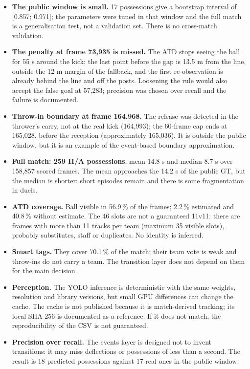 \documentclass[10pt,a4paper]{article}
\begin{document}
\begin{itemize}
\item \textbf{The public window is small.} 17 possessions give a bootstrap interval of
[0.857; 0.971]; the parameters were tuned in that window and the full match is a
generalisation test, not a validation set. There is no cross-match validation.
\item \textbf{The penalty at frame 73,935 is missed.} The ATD stops seeing the ball for 55 s
around the kick; the last point before the gap is 13.5 m from the line, outside the 12 m
margin of the fallback, and the first re-observation is already behind the line and off the
posts. Loosening the rule would also accept the false goal at 57,283; precision was chosen
over recall and the failure is documented.
\item \textbf{Throw-in boundary at frame 164,968.} The release was detected in the thrower's
carry, not at the real kick (164,993); the 60-frame cap ends at 165,028, before the
reception (approximately 165,036). It is outside the public window, but it is an example of
the event-based boundary approximation.
\item \textbf{Full match: 259 H/A possessions}, mean 14.8 s and median 8.7 s over 158,857
scored frames. The mean approaches the 14.2 s of the public GT, but the median is shorter:
short episodes remain and there is some fragmentation in duels.
\item \textbf{ATD coverage.} Ball visible in 56.9\,\% of the frames; 2.2\,\% estimated and
40.8\,\% without estimate. The 46 slots are not a guaranteed 11v11: there are frames with
more than 11 tracks per team (maximum 35 visible slots), probably substitutes, staff or
duplicates. No identity is inferred.
\item \textbf{Smart tags.} They cover 70.1\,\% of the match; their team vote is weak and
throw-ins do not carry a team. The transition layer does not depend on them for the main
decision.
\item \textbf{Perception.} The YOLO inference is deterministic with the same weights,
resolution and library versions, but small GPU differences can change the cache. The cache
is not published because it is match-derived tracking; its local SHA-256 is documented as a
reference. If it does not match, the reproducibility of the CSV is not guaranteed.
\item \textbf{Precision over recall.} The events layer is designed not to invent
transitions: it may miss deflections or possessions of less than a second. The result is 18
predicted possessions against 17 real ones in the public window.
\end{itemize}
\end{document}
